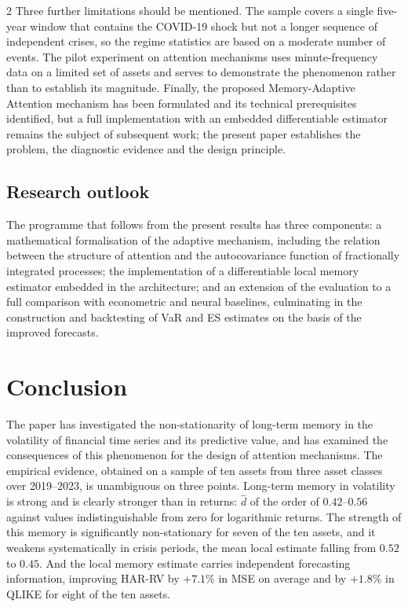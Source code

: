 \documentclass[a4paper,10pt,twoside]{article}
\begin{document}
\begin{multicols}{2}
Three further limitations should be mentioned. The sample covers a single five-year window that
contains the COVID-19 shock but not a longer sequence of independent crises, so the regime
statistics are based on a moderate number of events. The pilot experiment on attention mechanisms
uses minute-frequency data on a limited set of assets and serves to demonstrate the phenomenon
rather than to establish its magnitude. Finally, the proposed Memory-Adaptive Attention mechanism
has been formulated and its technical prerequisites identified, but a full implementation with an
embedded differentiable estimator remains the subject of subsequent work; the present paper
establishes the problem, the diagnostic evidence and the design principle.

\subsection{Research outlook}

The programme that follows from the present results has three components: a mathematical
formalisation of the adaptive mechanism, including the relation between the structure of attention
and the autocovariance function of fractionally integrated processes; the implementation of a
differentiable local memory estimator embedded in the architecture; and an extension of the
evaluation to a full comparison with econometric and neural baselines, culminating in the
construction and backtesting of VaR and ES estimates on the basis of the improved forecasts.


\section{Conclusion}\label{sec:concl}

The paper has investigated the non-stationarity of long-term memory in the volatility of financial
time series and its predictive value, and has examined the consequences of this phenomenon for
the design of attention mechanisms. The empirical evidence, obtained on a sample of ten assets from
three asset classes over 2019--2023, is unambiguous on three points. Long-term memory in
volatility is strong and is clearly stronger than in returns: $\hat d$ of the order of $0.42$--$0.56$
against values indistinguishable from zero for logarithmic returns. The strength of this memory is
significantly non-stationary for seven of the ten assets, and it weakens systematically in crisis
periods, the mean local estimate falling from $0.52$ to $0.45$. And the local memory estimate
carries independent forecasting information, improving HAR-RV by $+7.1\%$ in MSE on average and by
$+1.8\%$ in QLIKE for eight of the ten assets.


\end{multicols}
\end{document}
